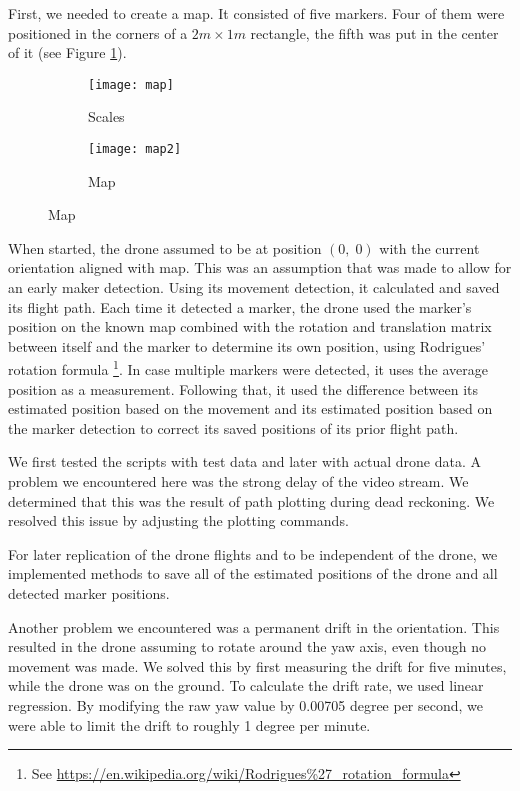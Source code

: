 \documentclass[12pt]{article}
\begin{document}
First, we needed to create a map. It consisted of five markers. Four of them were positioned in the corners of a \(2m \times 1m\) rectangle, the fifth was put in the center of it (see Figure \ref{fig:map}).

\begin{figure}[htbp]
  	\centering
  	\begin{subfigure}[b]{0.45\textwidth}
		\texttt{[image: map]}
		\caption{Scales}
	\end{subfigure}
	\begin{subfigure}[b]{0.45\textwidth}
		\texttt{[image: map2]}
		\caption{Map}
	\end{subfigure}
	\caption{Map}
  	\label{fig:map}
\end{figure}

When started, the drone assumed to be at position \((0,\; 0)\) with the current orientation aligned with map. This was an assumption that was made to allow for an early maker detection. Using its movement detection, it calculated and saved its flight path. Each time it detected a marker, the drone used the marker's position on the known map combined with the rotation and translation matrix between itself and the marker to determine its own position, using Rodrigues' rotation formula \footnote{
	See \url{https://en.wikipedia.org/wiki/Rodrigues\%27_rotation_formula}
}. In case multiple markers were detected, it uses the average position as a measurement. Following that, it used the difference between its estimated position based on the movement and its estimated position based on the marker detection to correct its saved positions of its prior flight path.

We first tested the scripts with test data and later with actual drone data. A problem we encountered here was the strong delay of the video stream. We determined that this was the result of path plotting during dead reckoning. We resolved this issue by adjusting the plotting commands.

For later replication of the drone flights and to be independent of the drone, we implemented methods to save all of the estimated positions of the drone and all detected marker positions.

Another problem we encountered was a permanent drift in the orientation. This resulted in the drone assuming to rotate around the yaw axis, even though no movement was made. We solved this by first measuring the drift for five minutes, while the drone was on the ground. To calculate the drift rate, we used linear regression. By modifying the raw yaw value by \num{0.00705} degree per second, we were able to limit the drift to roughly 1 degree per minute.
\end{document}
